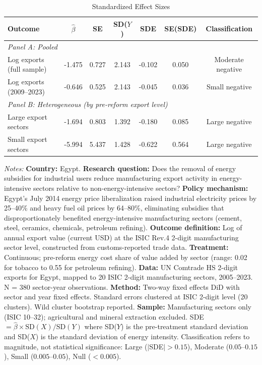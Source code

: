 \begin{table}[htbp]
\centering
\caption{Standardized Effect Sizes}
\label{tab:sde}
\begin{tabular}{lcccccc}
\toprule
Outcome & $\hat{\beta}$ & SE & SD($Y$) & SDE & SE(SDE) & Classification \\
\midrule
\multicolumn{7}{l}{\textit{Panel A: Pooled}} \\
Log exports (full sample) & -1.475 & 0.727 & 2.143 & -0.102 & 0.050 & Moderate negative \\
Log exports (2009--2023) & -0.646 & 0.525 & 2.143 & -0.045 & 0.036 & Small negative \\
\midrule
\multicolumn{7}{l}{\textit{Panel B: Heterogeneous (by pre-reform export level)}} \\
Large export sectors & -1.694 & 0.803 & 1.392 & -0.180 & 0.085 & Large negative \\
Small export sectors & -5.994 & 5.437 & 1.428 & -0.622 & 0.564 & Large negative \\
\bottomrule
\end{tabular}
\begin{tablenotes}
\small
\item \textit{Notes:} \textbf{Country:} Egypt. \textbf{Research question:} Does the removal of energy subsidies for industrial users reduce manufacturing export activity in energy-intensive sectors relative to non-energy-intensive sectors? \textbf{Policy mechanism:} Egypt's July 2014 energy price liberalization raised industrial electricity prices by 25--40\% and heavy fuel oil prices by 64--80\%, eliminating subsidies that disproportionately benefited energy-intensive manufacturing sectors (cement, steel, ceramics, chemicals, petroleum refining). \textbf{Outcome definition:} Log of annual export value (current USD) at the ISIC Rev.4 2-digit manufacturing sector level, constructed from customs-reported trade data. \textbf{Treatment:} Continuous; pre-reform energy cost share of value added by sector (range: 0.02 for tobacco to 0.55 for petroleum refining). \textbf{Data:} UN Comtrade HS 2-digit exports for Egypt, mapped to 20 ISIC 2-digit manufacturing sectors, 2005--2023. N = 380 sector-year observations. \textbf{Method:} Two-way fixed effects DiD with sector and year fixed effects. Standard errors clustered at ISIC 2-digit level (20 clusters). Wild cluster bootstrap reported. \textbf{Sample:} Manufacturing sectors only (ISIC 10--32); agricultural and mineral extraction excluded. SDE $= \hat{\beta} \times \text{SD}(X) / \text{SD}(Y)$ where SD($Y$) is the pre-treatment standard deviation and SD($X$) is the standard deviation of energy intensity. Classification refers to magnitude, not statistical significance: Large ($|$SDE$| > 0.15$), Moderate ($0.05$--$0.15$), Small ($0.005$--$0.05$), Null ($< 0.005$).
\end{tablenotes}
\end{table}
